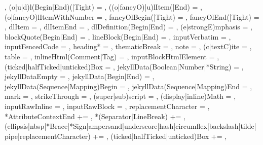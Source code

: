{{    },
  (o|u|d)l(Begin|End)(|Tight) = {%
    },
  ((o|fancyO)|u)lItem(|End) = {%
    },
  (o|fancyO)lItemWithNumber = {%
    },
  fancyOlBegin(|Tight) = {%
    },
  fancyOlEnd(|Tight) = {%
    },
  dlItem = {%
    },
  dlItemEnd = {%
    },
  dlDefinition(Begin|End) = {%
    },
  (e|strongE)mphasis = {%
    },
  blockQuote(Begin|End) = {%
    },
  lineBlock(Begin|End) = {%
    },
  inputVerbatim = {%
    },
  inputFencedCode = {%
    },
  heading* = {%
    },
  thematicBreak = {%
    },
  note = {%
    },
  (c|textC)ite = {%
    },
  table = {%
    },
  inlineHtml(Comment|Tag) = {%
    },
  inputBlockHtmlElement = {%
    },
  (ticked|halfTicked|unticked)Box = {%
    },
  jekyllData(Boolean|Number|*String) = {%
    },
  jekyllDataEmpty = {%
    },%
  jekyllData(Begin|End) = {%
    },
  jekyllData(Sequence|Mapping)Begin = {%
    },
  jekyllData(Sequence|Mapping)End = {%
    },
  mark = {%
    },
  strikeThrough = {%
    },
  (super|sub)script = {%
    },
  (display|inline)Math = {%
    },
  inputRawInline = {%
    },
  inputRawBlock = {%
    },
  replacementCharacter = {%
    },
  *AttributeContextEnd += {\GOBBLE},
  *(Separator|LineBreak) += {\GOBBLE},
  (ellipsis|nbsp|*Brace|*Sign|ampersand|underscore|hash|circumflex|backslash|tilde|pipe|replacementCharacter) += {\GOBBLE},
  (ticked|halfTicked|unticked)Box += {\GOBBLE},
}%
